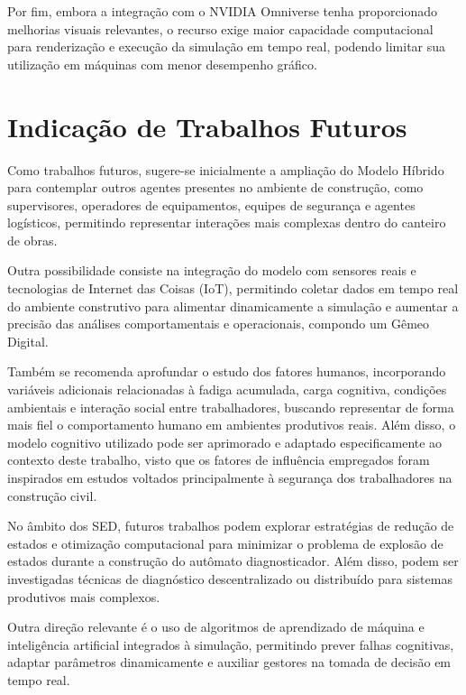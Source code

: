 Por fim, embora a integração com o NVIDIA Omniverse tenha proporcionado melhorias visuais relevantes, o recurso exige maior capacidade computacional para renderização e execução da simulação em tempo real, podendo limitar sua utilização em máquinas com menor desempenho gráfico.

\section{Indicação de Trabalhos Futuros}

\label{sec:futtrab}

Como trabalhos futuros, sugere-se inicialmente a ampliação do Modelo Híbrido para contemplar outros agentes presentes no ambiente de construção, como supervisores, operadores de equipamentos, equipes de segurança e agentes logísticos, permitindo representar interações mais complexas dentro do canteiro de obras.

Outra possibilidade consiste na integração do modelo com sensores reais e tecnologias de Internet das Coisas (IoT), permitindo coletar dados em tempo real do ambiente construtivo para alimentar dinamicamente a simulação e aumentar a precisão das análises comportamentais e operacionais, compondo um Gêmeo Digital.

Também se recomenda aprofundar o estudo dos fatores humanos, incorporando variáveis adicionais relacionadas à fadiga acumulada, carga cognitiva, condições ambientais e interação social entre trabalhadores, buscando representar de forma mais fiel o comportamento humano em ambientes produtivos reais. Além disso, o modelo cognitivo utilizado pode ser aprimorado e adaptado especificamente ao contexto deste trabalho, visto que os fatores de influência empregados foram inspirados em estudos voltados principalmente à segurança dos trabalhadores na construção civil.

No âmbito dos SED, futuros trabalhos podem explorar estratégias de redução de estados e otimização computacional para minimizar o problema de explosão de estados durante a construção do autômato diagnosticador. Além disso, podem ser investigadas técnicas de diagnóstico descentralizado ou distribuído para sistemas produtivos mais complexos.

Outra direção relevante é o uso de algoritmos de aprendizado de máquina e inteligência artificial integrados à simulação, permitindo prever falhas cognitivas, adaptar parâmetros dinamicamente e auxiliar gestores na tomada de decisão em tempo real.